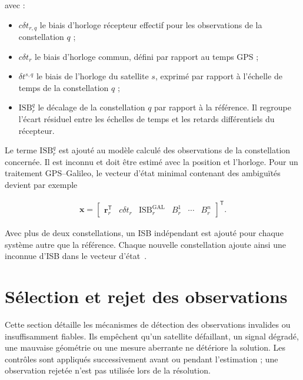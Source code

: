 avec :

\begin{itemize}
    \item $c\delta t_{r,q}$ le biais d'horloge récepteur effectif pour les
    observations de la constellation $q$ ;
    \item $c\delta t_r$ le biais d'horloge commun, défini par rapport au temps
    GPS ;
    \item $\delta t^{s,q}$ le biais de l'horloge du satellite $s$, exprimé par
    rapport à l'échelle de temps de la constellation $q$ ;
    \item $\mathrm{ISB}_{r}^{q}$ le décalage de la constellation $q$ par
    rapport à la référence. Il regroupe l'écart résiduel entre les échelles de
    temps et les retards différentiels du récepteur.
\end{itemize}

Le terme $\mathrm{ISB}_{r}^{q}$ est ajouté au modèle calculé des observations
de la constellation concernée. Il est inconnu et doit être estimé avec la
position et l'horloge. Pour un traitement GPS--Galileo, le vecteur d'état
minimal contenant des ambiguïtés devient par exemple

\begin{align}
\mathbf x
=
\begin{bmatrix}
\mathbf r_r^{\mathsf T} &
c\delta t_r &
\mathrm{ISB}_{r}^{\mathrm{GAL}} &
B_r^1 & \cdots & B_r^n
\end{bmatrix}^{\mathsf T}.
\label{eq:multiconstellation_state}
\end{align}


Avec plus de deux constellations, un ISB indépendant est ajouté pour chaque
système autre que la référence. Chaque
nouvelle constellation ajoute ainsi une inconnue d'ISB dans le vecteur d'état~\cite{odijkTeunissen2013}.

\section{Sélection et rejet des observations}
\label{sec:observation_rejection}

Cette section détaille les mécanismes de détection des observations invalides
ou insuffisamment fiables. Ils empêchent qu'un satellite défaillant, un signal
dégradé, une mauvaise géométrie ou une mesure aberrante ne détériore la
solution. Les contrôles sont appliqués successivement avant ou pendant
l'estimation ; une observation rejetée n'est pas utilisée lors de la résolution.

